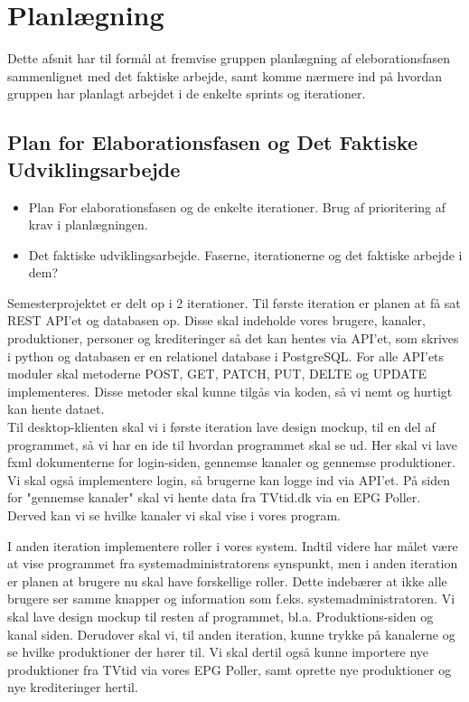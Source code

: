 \section{Planlægning}
Dette afsnit har til formål at fremvise gruppen planlægning af eleborationsfasen sammenlignet med det faktiske arbejde, samt komme nærmere ind på hvordan gruppen har planlagt arbejdet i de enkelte sprints og iterationer.

\subsection{Plan for Elaborationsfasen og Det Faktiske Udviklingsarbejde}
\begin{itemize}
    \item Plan For elaborationsfasen og de enkelte iterationer. Brug af prioritering af krav i planlægningen.
    \item Det faktiske udviklingsarbejde. Faserne, iterationerne og det faktiske  arbejde i dem? \\
\end{itemize}

\noindent
Semesterprojektet er delt op i 2 iterationer. Til første iteration er planen at få sat REST API'et og databasen op. Disse skal indeholde vores brugere, kanaler, produktioner, personer og krediteringer så det kan hentes via API'et, som skrives i python og databasen er en relationel database i PostgreSQL. For alle API'ets moduler skal metoderne POST, GET, PATCH, PUT, DELTE og UPDATE implementeres. Disse metoder skal kunne tilgås via koden, så vi nemt og hurtigt kan hente dataet.\\
Til desktop-klienten skal vi i første iteration lave design mockup, til en del af programmet, så vi har en ide til hvordan programmet skal se ud. Her skal vi lave fxml dokumenterne for login-siden, gennemse kanaler og gennemse produktioner. Vi skal også implementere login, så brugerne kan logge ind via API'et. På siden for "gennemse kanaler"  skal vi hente data fra TVtid.dk via en EPG Poller. Derved kan vi se hvilke kanaler vi skal vise i vores program. \\

\noindent
I anden iteration implementere roller i vores system. Indtil videre har målet være at vise programmet fra systemadministratorens synspunkt, men i anden iteration er planen at brugere nu skal have forskellige roller. Dette indebærer at ikke alle brugere ser samme knapper og information som f.eks. systemadministratoren. 
Vi skal lave design mockup til resten af programmet, bl.a. Produktions-siden og kanal siden. Derudover skal vi, til anden iteration, kunne trykke på kanalerne og se hvilke produktioner der hører til. Vi skal dertil også kunne importere nye produktioner fra TVtid via vores EPG Poller, samt oprette nye produktioner og nye krediteringer hertil.\\

